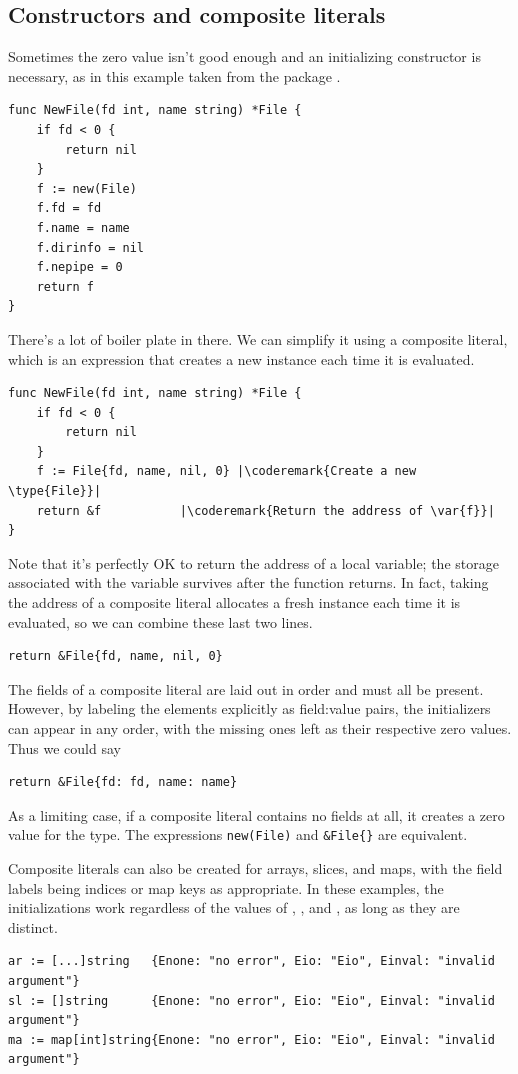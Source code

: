 \subsection{Constructors and composite literals}
Sometimes the zero value isn't good enough and an initializing
constructor is necessary, as in this example taken from the package
.
\begin{lstlisting}
func NewFile(fd int, name string) *File {
    if fd < 0 {
        return nil
    }
    f := new(File)
    f.fd = fd
    f.name = name
    f.dirinfo = nil
    f.nepipe = 0
    return f
}
\end{lstlisting}
There's a lot of boiler plate in there. We can simplify it using a
composite literal, which is an expression that creates a new instance
each time it is evaluated.

\begin{lstlisting}
func NewFile(fd int, name string) *File {
    if fd < 0 {
        return nil
    }
    f := File{fd, name, nil, 0}	|\coderemark{Create a new \type{File}}|
    return &f			|\coderemark{Return the address of \var{f}}|
}
\end{lstlisting}
Note that it's perfectly OK to return the address of a local variable;
the storage associated with the variable survives after the function
returns. In fact, taking the address of a composite literal allocates a
fresh instance each time it is evaluated, so we can combine these last
two lines.

\begin{lstlisting}
return &File{fd, name, nil, 0}
\end{lstlisting}
The fields of a composite literal are laid out in order and must all be
present. However, by labeling the elements explicitly as field:value
pairs, the initializers can appear in any order, with the missing ones
left as their respective zero values. Thus we could say

\begin{lstlisting}
return &File{fd: fd, name: name}
\end{lstlisting}
As a limiting case, if a composite literal contains no fields at all, it
creates a zero value for the type. The expressions
\lstinline{new(File)} and 
\lstinline|&File{}| are equivalent.

Composite literals can also be created for arrays, slices, and maps,
with the field labels being indices or map keys as appropriate. In these
examples, the initializations work regardless of the values of
,
, and , as long as they are distinct.
\begin{lstlisting}
ar := [...]string   {Enone: "no error", Eio: "Eio", Einval: "invalid argument"}
sl := []string      {Enone: "no error", Eio: "Eio", Einval: "invalid argument"}
ma := map[int]string{Enone: "no error", Eio: "Eio", Einval: "invalid argument"}
\end{lstlisting}

